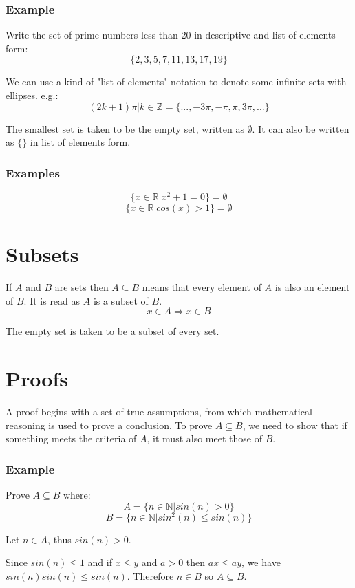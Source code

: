 \documentclass[12pt]{report}
\newcommand{\N}{\mathbb{N}}
\newcommand{\Z}{\mathbb{Z}}
\newcommand{\R}{\mathbb{R}}
\begin{document}
\begin{flushleft}
\subsubsection*{Example}
Write the set of prime numbers less than 20 in descriptive and list of elements
form:
\[\{2, 3, 5, 7, 11, 13, 17, 19\}\]

We can use a kind of "list of elements" notation to denote some infinite sets 
with ellipses. e.g.: 
\[(2k + 1)\pi | k \in \Z = \{..., -3\pi, -\pi, \pi, 3\pi, ...\}\]

The smallest set is taken to be the empty set, written as \(\emptyset\). It can
 also be written as \(\{\}\) in list of elements form.

\subsubsection*{Examples}
\[\{x \in \R | x^2 + 1 = 0\} = \emptyset\]
\[\{x \in \R | cos(x) > 1\} = \emptyset\]

\section*{Subsets}
If \(A\) and \(B\) are sets then \(A \subseteq B\) means that every element of
\(A\) is also an element of \(B\). It is read as \(A\) is a subset of \(B\).
\[x \in A \Rightarrow x \in B\]

The empty set is taken to be a subset of every set.

\section*{Proofs}
A proof begins with a set of true assumptions, from which mathematical 
reasoning is used to prove a conclusion.
To prove \(A \subseteq B\), we need to show that if something meets the 
criteria of \(A\), it must also meet those of \(B\).

\subsubsection*{Example}
Prove \(A \subseteq B\) where:
\[A = \{n \in \N | sin(n) > 0\}\]
\[B = \{n \in \N | sin^2(n) \leq sin(n)\}\]
\par
Let \(n \in A\), thus \(sin(n) > 0\).
\par
Since \(sin(n) \leq 1\) and if \(x \leq y\) and \(a > 0\) then \(ax \leq ay\),
we have \(sin(n)sin(n) \leq sin(n)\). Therefore \(n \in B\) so 
\(A \subseteq B\).


\end{flushleft}
\end{document}
